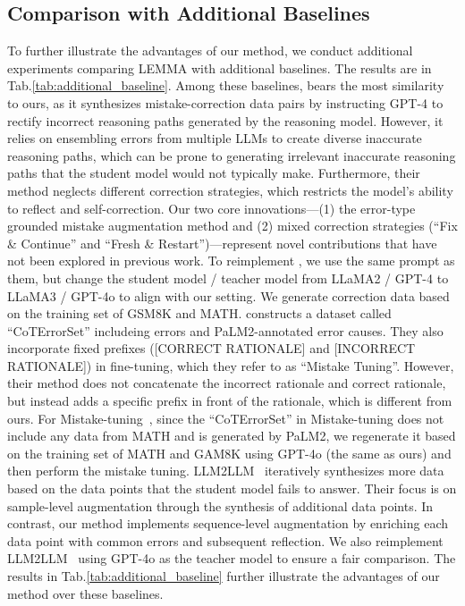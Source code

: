 \subsection{Comparison with Additional Baselines}

\noindent To further illustrate the advantages of our method, we conduct additional experiments comparing LEMMA with additional baselines. The results are in Tab.\ref{tab:additional_baseline}. Among these baselines, \citet{an2023learning} bears the most similarity to ours, as it synthesizes mistake-correction data pairs by instructing GPT-4 to rectify incorrect reasoning paths generated by the reasoning model. However, it relies on ensembling errors from multiple LLMs to create diverse inaccurate reasoning paths, which can be prone to generating irrelevant inaccurate reasoning paths that the student model would not typically make. Furthermore, their method neglects different correction strategies, which restricts the model's ability to reflect and self-correction. Our two core innovations—(1) the error-type grounded mistake augmentation method and (2) mixed correction strategies (``Fix \& Continue'' and ``Fresh \& Restart'')—represent novel contributions that have not been explored in previous work. To reimplement \citet{an2023learning}, we use the same prompt as them, but change the student model / teacher model from LLaMA2 / GPT-4 to LLaMA3 / GPT-4o to align with our setting. We generate correction data based on the training set of GSM8K and MATH. 
\citet{tong2024can} constructs a dataset called ``CoTErrorSet'' includeing errors and PaLM2-annotated error causes. They also incorporate fixed prefixes ([CORRECT RATIONALE] and [INCORRECT RATIONALE]) in fine-tuning, which they refer to as ``Mistake Tuning''. However, their method does not concatenate the incorrect rationale and correct rationale, but instead adds a specific prefix in front of the rationale, which is different from ours.
For Mistake-tuning~\cite{tong2024can}, since the ``CoTErrorSet'' in Mistake-tuning does not include any data from MATH and is generated by PaLM2, we regenerate it based on the training set of MATH and GAM8K using GPT-4o (the same as ours) and then perform the mistake tuning. LLM2LLM~\cite{lee2024llm2llm} iteratively synthesizes more data based
on the data points that the student model fails to
answer. Their focus is on
sample-level augmentation through the synthesis
of additional data points. In contrast, our method
implements sequence-level augmentation by enriching each data point with common errors and
subsequent reflection. We also reimplement LLM2LLM~\cite{lee2024llm2llm} using GPT-4o as the teacher model to ensure a fair comparison. The results in Tab.\ref{tab:additional_baseline} further illustrate the advantages of our method over these baselines.















